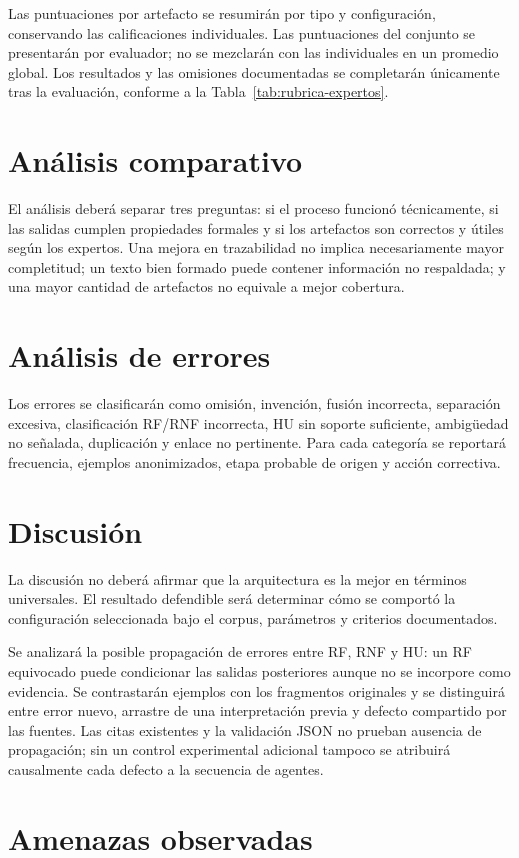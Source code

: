 Las puntuaciones por artefacto se resumirán por tipo y configuración, conservando las calificaciones individuales. Las puntuaciones del conjunto se presentarán por evaluador; no se mezclarán con las individuales en un promedio global. Los resultados y las omisiones documentadas se completarán únicamente tras la evaluación, conforme a la Tabla~\ref{tab:rubrica-expertos}.

\section{Análisis comparativo}


El análisis deberá separar tres preguntas: si el proceso funcionó técnicamente, si las salidas cumplen propiedades formales y si los artefactos son correctos y útiles según los expertos. Una mejora en trazabilidad no implica necesariamente mayor completitud; un texto bien formado puede contener información no respaldada; y una mayor cantidad de artefactos no equivale a mejor cobertura.

\section{Análisis de errores}

Los errores se clasificarán como omisión, invención, fusión incorrecta, separación excesiva, clasificación RF/RNF incorrecta, HU sin soporte suficiente, ambigüedad no señalada, duplicación y enlace no pertinente. Para cada categoría se reportará frecuencia, ejemplos anonimizados, etapa probable de origen y acción correctiva.

\section{Discusión}


La discusión no deberá afirmar que la arquitectura es la mejor en términos universales. El resultado defendible será determinar cómo se comportó la configuración seleccionada bajo el corpus, parámetros y criterios documentados.

Se analizará la posible propagación de errores entre RF, RNF y HU: un RF equivocado puede condicionar las salidas posteriores aunque no se incorpore como evidencia. Se contrastarán ejemplos con los fragmentos originales y se distinguirá entre error nuevo, arrastre de una interpretación previa y defecto compartido por las fuentes. Las citas existentes y la validación JSON no prueban ausencia de propagación; sin un control experimental adicional tampoco se atribuirá causalmente cada defecto a la secuencia de agentes.

\section{Amenazas observadas}


